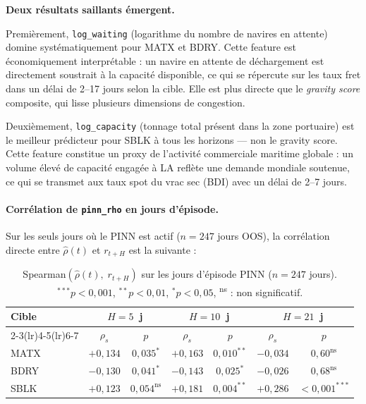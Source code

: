 \textbf{Deux résultats saillants émergent.}

Premièrement, \texttt{log\_waiting} (logarithme du nombre de navires en
attente) domine systématiquement pour MATX et BDRY. Cette feature est
économiquement interprétable : un navire en attente de déchargement est
directement soustrait à la capacité disponible, ce qui se répercute sur les
taux fret dans un délai de 2--17 jours selon la cible. Elle est plus directe
que le \emph{gravity score} composite, qui lisse plusieurs dimensions
de congestion.

Deuxièmement, \texttt{log\_capacity} (tonnage total présent dans la zone
portuaire) est le meilleur prédicteur pour SBLK à tous les horizons ---
non le gravity score. Cette feature constitue un proxy de l'activité
commerciale maritime globale : un volume élevé de capacité engagée à LA
reflète une demande mondiale soutenue, ce qui se transmet aux taux spot du
vrac sec (BDI) avec un délai de 2--7 jours.

\paragraph{Corrélation de \texttt{pinn\_rho} en jours d'épisode.}

Sur les seuls jours où le PINN est actif ($n = 247$ jours OOS),
la corrélation directe entre $\hat{\rho}(t)$ et $r_{t+H}$ est la suivante :

\begin{table}[ht]
\centering
\caption{Spearman$(\hat{\rho}(t),\; r_{t+H})$ sur les jours d'épisode PINN
($n = 247$ jours). $^{***}p<0{,}001$, $^{**}p<0{,}01$, $^{*}p<0{,}05$,
\textsuperscript{ns} : non significatif.}
\label{tab:pinn_raw_corr}
\small
\begin{tabular}{lcccccc}
\toprule
\textbf{Cible} & \multicolumn{2}{c}{$H = 5$~j} & \multicolumn{2}{c}{$H = 10$~j} &
\multicolumn{2}{c}{$H = 21$~j} \\
\cmidrule(lr){2-3}\cmidrule(lr){4-5}\cmidrule(lr){6-7}
 & $\rho_s$ & $p$ & $\rho_s$ & $p$ & $\rho_s$ & $p$ \\
\midrule
MATX & $+0{,}134$ & $0{,}035^{*}$ & $+0{,}163$ & $0{,}010^{**}$ &
      $-0{,}034$ & $0{,}60^{\text{ns}}$ \\
BDRY & $-0{,}130$ & $0{,}041^{*}$ & $-0{,}143$ & $0{,}025^{*}$  &
      $-0{,}026$ & $0{,}68^{\text{ns}}$ \\
SBLK & $+0{,}123$ & $0{,}054^{\text{ns}}$ & $+0{,}181$ & $0{,}004^{**}$ &
      $+0{,}286$ & $<0{,}001^{***}$ \\
\bottomrule
\end{tabular}
\end{table}

